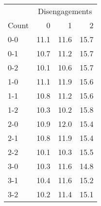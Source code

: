 \begin{tabular}{l|rrr}
 & \multicolumn{3}{c}{Disengagements}\\
Count & 0 & 1 & 2 \\
  \hline
0-0 & 11.1 & 11.6 & 15.7 \\ 
  0-1 & 10.7 & 11.2 & 15.7 \\ 
  0-2 & 10.1 & 10.6 & 15.7 \\ 
  1-0 & 11.1 & 11.9 & 15.6 \\ 
  1-1 & 10.8 & 11.2 & 15.6 \\ 
  1-2 & 10.3 & 10.2 & 15.8 \\ 
  2-0 & 10.9 & 12.0 & 15.4 \\ 
  2-1 & 10.8 & 11.9 & 15.4 \\ 
  2-2 & 10.1 & 10.3 & 15.5 \\ 
  3-0 & 10.3 & 11.6 & 14.8 \\ 
  3-1 & 10.4 & 11.6 & 15.2 \\ 
  3-2 & 10.2 & 11.4 & 15.1 \\ 
\end{tabular}
